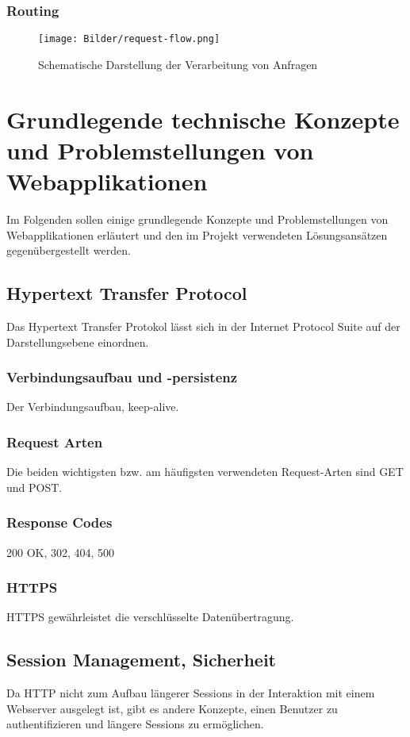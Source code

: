 \documentclass[12pt]{report}
\begin{document}
\subsection{Routing}
\begin{figure}[htp]
\centering
\texttt{[image: Bilder/request-flow.png]}
\caption{Schematische Darstellung der Verarbeitung von Anfragen \cite{sf2:HTTPFundamentals}}
\label{}
\end{figure}

\chapter{Grundlegende technische Konzepte und Problemstellungen von Webapplikationen}

Im Folgenden sollen einige grundlegende Konzepte und Problemstellungen von Webapplikationen erläutert und den im Projekt verwendeten Lösungsansätzen gegenübergestellt werden. 

\section{Hypertext Transfer Protocol}
Das Hypertext Transfer Protokol lässt sich in der Internet Protocol Suite auf der Darstellungsebene einordnen.\cite{wiki:HTTP}
\subsection{Verbindungsaufbau und -persistenz}
Der Verbindungsaufbau, keep-alive.
\subsection{Request Arten}
Die beiden wichtigsten bzw. am häufigsten verwendeten Request-Arten sind GET und POST.
\subsection{Response Codes}
200 OK, 302, 404, 500
\subsection{HTTPS}
HTTPS gewährleistet die verschlüsselte Datenübertragung.

\section{Session Management, Sicherheit}
Da HTTP nicht zum Aufbau längerer Sessions in der Interaktion mit einem Webserver ausgelegt ist, gibt es andere Konzepte, einen Benutzer zu authentifizieren und längere Sessions zu ermöglichen.
\end{document}
